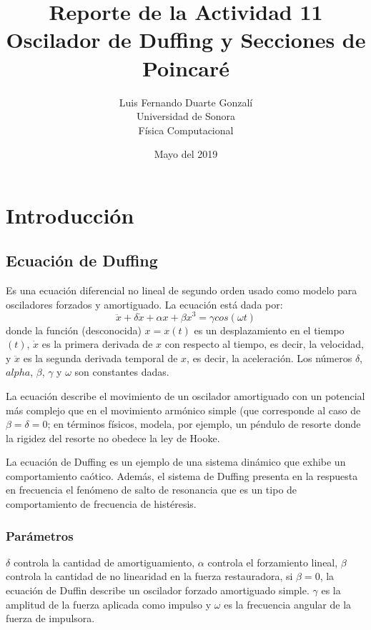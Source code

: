 \documentclass{article}
\title{\textbf{Reporte de la Actividad 11}\\ Oscilador de Duffing y Secciones de Poincaré}
\author{Luis Fernando Duarte Gonzalí \\ Universidad de Sonora \\ Física Computacional}
\date{Mayo del 2019}
\begin{document}
\maketitle


\section{Introducción}
\subsection{Ecuación de Duffing}
Es una ecuación diferencial no lineal de segundo orden usado como modelo para osciladores forzados y amortiguado. La ecuación está dada por:
\begin{equation}
    \ddot x + \delta \dot x + \alpha x + \beta x^3 = \gamma cos (\omega t)
\end{equation}
donde la función (desconocida) $x = x(t)$ es un desplazamiento en el tiempo $(t)$, $\dot x$ es la primera derivada de $x$ con respecto al tiempo, es decir, la velocidad, y $\ddot x$ es la segunda derivada temporal de $x$, es decir, la aceleración. Los números $\delta$, $alpha$, $\beta$, $\gamma$ y $\omega$ son constantes dadas.

La ecuación describe el movimiento de un oscilador amortiguado con un potencial más complejo que en el movimiento armónico simple (que corresponde al caso de $\beta = \delta = 0$; en términos físicos, modela, por ejemplo, un péndulo de resorte donde la rigidez del resorte no obedece la ley de Hooke.

La ecuación de Duffing es un ejemplo de una sistema dinámico que exhibe un comportamiento caótico. Además, el sistema de Duffing presenta en la respuesta en frecuencia el fenómeno de salto de resonancia que es un tipo de comportamiento de frecuencia de histéresis.

\subsubsection{Parámetros}
$\delta$ controla la cantidad de amortiguamiento, $\alpha$ controla el forzamiento lineal, $\beta$ controla la cantidad de no linearidad en la fuerza restauradora, si $\beta = 0$, la ecuación de Duffin describe un oscilador forzado amortiguado simple. $\gamma$ es la amplitud de la fuerza aplicada como impulso y $\omega$ es la frecuencia angular de la fuerza de impulsora.
\end{document}
